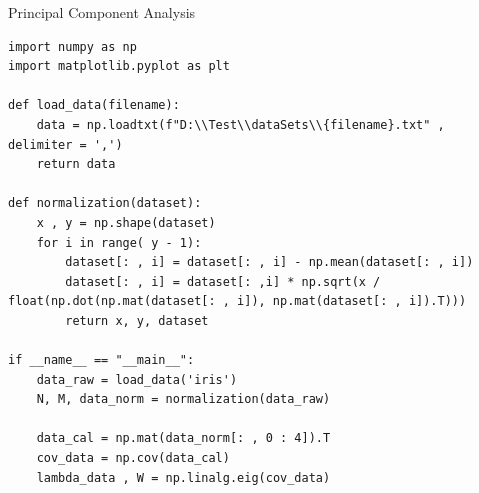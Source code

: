 \documentclass[
	ngerman,
     solution=true
	]{tudaexercise}
\begin{document}
\begin{task}{Principal Component Analysis}
\begin{subtask}[3c)]
\begin{lstlisting}
import numpy as np
import matplotlib.pyplot as plt

def load_data(filename):
    data = np.loadtxt(f"D:\\Test\\dataSets\\{filename}.txt" , delimiter = ',')
    return data

def normalization(dataset):
    x , y = np.shape(dataset)
    for i in range( y - 1):
        dataset[: , i] = dataset[: , i] - np.mean(dataset[: , i])
        dataset[: , i] = dataset[: ,i] * np.sqrt(x / float(np.dot(np.mat(dataset[: , i]), np.mat(dataset[: , i]).T)))
        return x, y, dataset

if __name__ == "__main__":
    data_raw = load_data('iris')
    N, M, data_norm = normalization(data_raw)
    
    data_cal = np.mat(data_norm[: , 0 : 4]).T
    cov_data = np.cov(data_cal)
    lambda_data , W = np.linalg.eig(cov_data)


\end{lstlisting}
\end{subtask}
\end{task}
\end{document}
